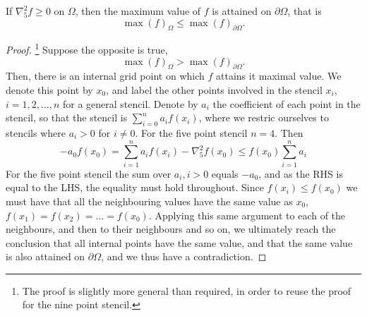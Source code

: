 \begin{lemma}\label{pde:lemma:max}
If $\nabla_5^2 f \geq 0$ on $\Omega$, then the maximum value of $f$ is attained on $\partial \Omega$, that is
$$
\max(f)_\Omega \leq \max(f)_{\partial \Omega}.
$$
\end{lemma}
\begin{proof}
  \footnote{The proof is slightly more general than required, in order to reuse the proof for the nine point stencil.}
Suppose the opposite is true,
$$
\max(f)_\Omega > \max(f)_{\partial \Omega}.
$$
Then, there is an internal grid point on which $f$ attains it maximal value.
We denote this point by $x_0$, and label the other points involved in the stencil $x_i$, $i = 1, 2, \dots, n$ for a general stencil.
Denote by $a_i$ the coefficient of each point in the stencil, so that the stencil is $\sum_{i=0}^n a_i f(x_i)$, where we restric ourselves to stencils where $a_i > 0$ for $i\neq 0$.
For the five point stencil $n=4$.
Then
\begin{equation}
  -a_0 f(x_0)
  = \sum_{i=1}^n a_i f(x_i) - \nabla_5^2 f(x_0)
  \leq f(x_0) \sum_{i=1}^n a_i 
\end{equation}
For the five point stencil the sum over $a_i, i>0$ equals $-a_0$, and as the RHS is equal to the LHS, the equality must hold throughout.
Since $f(x_i) \leq f(x_0)$ we must have that all the neighbouring values have the same value as $x_0$, $f(x_1) = f(x_2) = \dots = f(x_0)$.
Applying this same argument to each of the neighbours, and then to their neighbours and so on, we ultimately reach the conclusion that all internal points have the same value, and that the same value is also attained on $\partial \Omega$, and we thus have a contradiction.

\end{proof}

